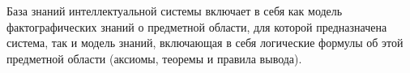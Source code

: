 База знаний интеллектуальной системы включает в себя как модель фактографических знаний о предметной области, для которой предназначена система, так и модель знаний, включающая в себя логические формулы об этой предметной области (аксиомы, теоремы и правила вывода).

